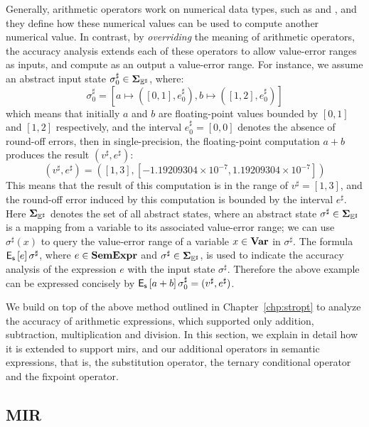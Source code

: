 Generally, arithmetic operators work on numerical data types, such as
\inttype{} and \floattype, and they define how these numerical values can be
used to compute another numerical value.  In contrast, by \emph{overriding}
the meaning of arithmetic operators, the accuracy analysis extends each of
these operators to allow value-error ranges as inputs, and compute as an
output a value-error range.  For instance, we assume an abstract input state
$\sigma^\sharp_0 \in \mathbf{\Sigma}_{\mathbb{E}^\sharp}$, where:
\begin{equation}
        \sigma^\sharp_0 = \left[
            a \mapsto ([0, 1], e^\sharp_0),
            b \mapsto ([1, 2], e^\sharp_0) \right]
\end{equation}
which means that initially
$a$ and $b$ are floating-point values bounded by $[0, 1]$ and $[1, 2]$
respectively, and the interval $e^\sharp_0 = [0, 0]$ denotes the absence of
round-off errors, then in single-precision, the floating-point computation $a
+ b$ produces the result $\left( v^\sharp, e^\sharp \right)$:
\begin{equation}
    \left( v^\sharp, e^\sharp \right) = \left(
        [1, 3], [-1.19209304 \times 10^{-7}, 1.19209304 \times 10^{-7}]
    \right)
\end{equation}
This means that the result of this computation is in the range of $v^\sharp =
[1, 3]$, and the round-off error induced by this computation is bounded by the
interval $e^\sharp$.  Here $\mathbf{\Sigma}_{\mathbb{E}^\sharp}$ denotes the set of all abstract states,
where an abstract state $\sigma^\sharp \in \mathbf{\Sigma}_{\mathbb{E}^\sharp}$ is a mapping from a
variable to its associated value-error range; we can use $\sigma^\sharp(x)$ to
query the value-error range of a variable $x \in \mathbf{Var}$ in $\sigma^\sharp$.
The formula $\operatorname{\mathsf{E}_\mathsf{s}}\left[{e}\right]{\sigma^\sharp}$, where $e \in \mathbf{SemExpr}$ and
$\sigma^\sharp \in \mathbf{\Sigma}_{\mathbb{E}^\sharp}$, is used to indicate the accuracy analysis of
the expression $e$ with the input state $\sigma^\sharp$.  Therefore the above
example can be expressed concisely by $\operatorname{\mathsf{E}_\mathsf{s}}\left[{a + b}\right]{\sigma^\sharp_0} =
(v^\sharp, e^\sharp)$.

We build on top of the above method outlined in Chapter~\ref{chp:stropt} to
analyze the accuracy of arithmetic expressions, which supported only addition,
subtraction, multiplication and division.  In this section, we explain in
detail how it is extended to support \glspl{mir}, and our additional operators
in semantic expressions, that is, the substitution operator, the ternary
conditional operator and the fixpoint operator.

\subsection{MIR}

